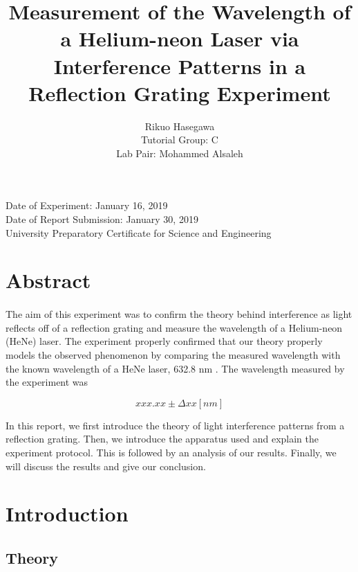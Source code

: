 \documentclass{article}
\title{Measurement of the Wavelength of a Helium-neon Laser via Interference Patterns in a Reflection Grating Experiment}
\author{ Rikuo Hasegawa \\ Tutorial Group: C \\ Lab Pair: Mohammed Alsaleh }
\begin{document}
\maketitle
\thispagestyle{fancy}
\vspace*{\fill}
\parbox{\linewidth}{\centering%
Date of Experiment: January 16, 2019
\\ Date of Report Submission: January 30, 2019
\\ University Preparatory Certificate for Science and Engineering
}
\newpage

\section*{Abstract}
\paragraph{}
The aim of this experiment was to confirm the theory behind interference as light reflects off of a reflection grating and measure the wavelength of a Helium-neon (HeNe) laser. The experiment properly confirmed that our theory properly models the observed phenomenon by comparing the measured wavelength with the known wavelength of a HeNe laser, 632.8 nm \autocite{WikiHeNe}. The wavelength measured by the experiment was

$$
xxx.xx \pm \Delta xx [nm]
$$

In this report, we first introduce the theory of light interference patterns from a reflection grating. Then, we introduce the apparatus used and explain the experiment protocol. This is followed by an analysis of our results. Finally, we will discuss the results and give our conclusion.

\section{Introduction}

\subsection{Theory}
\end{document}
